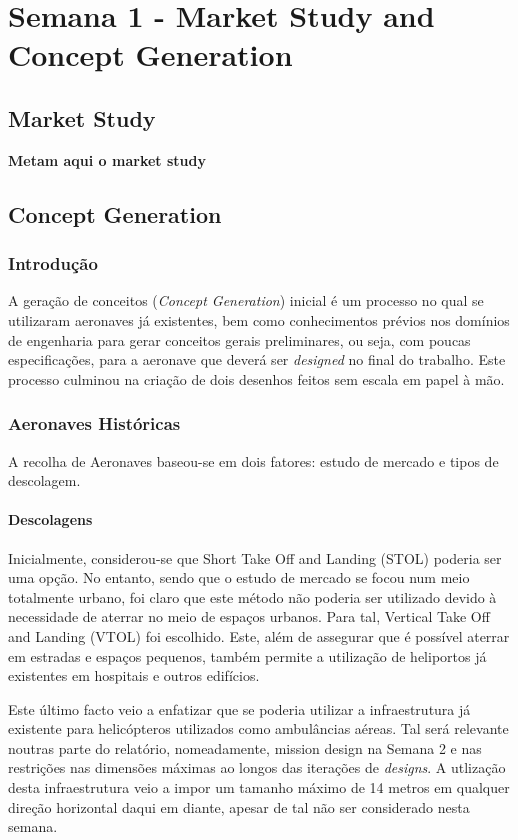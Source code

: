 \section{Semana 1 - Market Study and Concept Generation}
\subsection{Market Study}
\textbf{\Large{Metam aqui o market study}}
\subsection{Concept Generation}
\subsubsection{Introdução}
A geração de conceitos (\textit{Concept Generation}) inicial é um processo no qual se utilizaram aeronaves já existentes, bem como conhecimentos prévios nos domínios de engenharia para gerar conceitos gerais preliminares, ou seja, com poucas especificações, para a aeronave que deverá ser \textit{designed} no final do trabalho. Este processo culminou na criação de dois desenhos feitos sem escala em papel à mão.\par
\subsubsection{Aeronaves Históricas}
A recolha de Aeronaves baseou-se em dois fatores: estudo de mercado e tipos de descolagem.\par
\paragraph{Descolagens}
Inicialmente, considerou-se que Short Take Off and Landing (STOL) poderia ser uma opção. No entanto, sendo que o estudo de mercado se focou num meio totalmente urbano, foi claro que este método não poderia ser utilizado devido à necessidade de aterrar no meio de espaços urbanos. Para tal, Vertical Take Off and Landing (VTOL) foi escolhido. Este, além de assegurar que é possível aterrar em estradas e espaços pequenos, também permite a utilização de heliportos já existentes em hospitais e outros edifícios.\par
Este último facto veio a enfatizar que se poderia utilizar a infraestrutura já existente para helicópteros utilizados como ambulâncias aéreas. Tal será relevante noutras parte do relatório, nomeadamente, mission design na Semana 2 e nas restrições nas dimensões máximas ao longos das iterações de \textit{designs}. A utlização desta infraestrutura veio a impor um tamanho máximo de 14 metros em qualquer direção horizontal daqui em diante, apesar de tal não ser considerado nesta semana.\par
